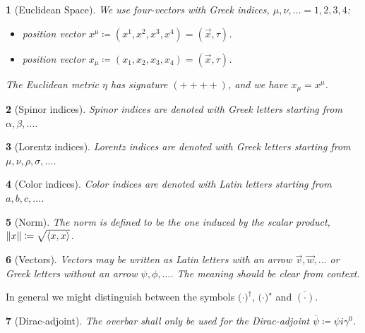 \documentclass{article}
\theoremstyle{plain} %
\theoremstyle{convention} %
\newtheorem*{convention}{} %
\theoremstyle{remark} %
\numberwithin{equation}{section}
\begin{document}
\begin{convention}[Euclidean Space]
We use four-vectors with Greek indices, $\mu, \nu, \dots = 1, 2, 3, 4$:
\begin{itemize}
  \item position vector $x^{\mu} \coloneqq (x^1, x^2, x^3, x^4) = (\vec{x}, \tau)$.
  \item position vector $x_{\mu} \coloneqq (x_1, x_2, x_3, x_4) = (\vec{x}, \tau)$.
\end{itemize}

The Euclidean metric $\eta$ has signature $(++++)$, and we have $x_{\mu} = x^{\mu}$.

\end{convention}

\begin{convention}[Spinor indices]
Spinor indices are denoted with Greek letters starting from $\alpha, \beta, \dots$.
\end{convention}

\begin{convention}[Lorentz indices]
Lorentz indices are denoted with Greek letters starting from $\mu, \nu, \rho, \sigma, \dots$.
\end{convention}

\begin{convention}[Color indices]
Color indices are denoted with Latin letters starting from $a, b, c, \dots$.
\end{convention}

\begin{convention}[Norm]
The norm is defined to be the one induced by the scalar product, $\norm{x} \coloneqq \sqrt{\langle x, x \rangle}$.
\end{convention}

\begin{convention}[Vectors]
Vectors may be written as Latin letters with an arrow $\vec{v}, \vec{w}, \dots$ or Greek letters without an arrow $\psi, \phi, \dots$. The meaning should be clear from context.
\end{convention}

In general we might distinguish between the symbols ${(\cdot})^{\dagger}$, ${(\cdot})^{\star}$ and $\overline{(\cdot)}$.

\begin{convention}[Dirac-adjoint]
  The overbar shall only be used for the Dirac-adjoint $\overline{\psi} \coloneqq \psi i \gamma^0$.
\end{convention}
\end{document}
